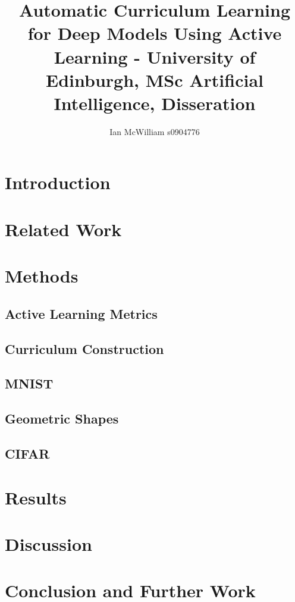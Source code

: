 \documentclass[a4paper,10pt]{article}
\begin{document}
\title{Automatic Curriculum Learning for Deep Models Using Active Learning - University of Edinburgh, MSc Artificial Intelligence, Disseration}
\author{Ian McWilliam s0904776} 
\date{}
\maketitle

\section{Introduction}

\section{Related Work}

\section{Methods}
\subsection{Active Learning Metrics}
\subsection{Curriculum Construction}
\subsection{MNIST}
\subsection{Geometric Shapes}
\subsection{CIFAR}

\section{Results}

\section{Discussion}

\section{Conclusion and Further Work}
\end{document}

